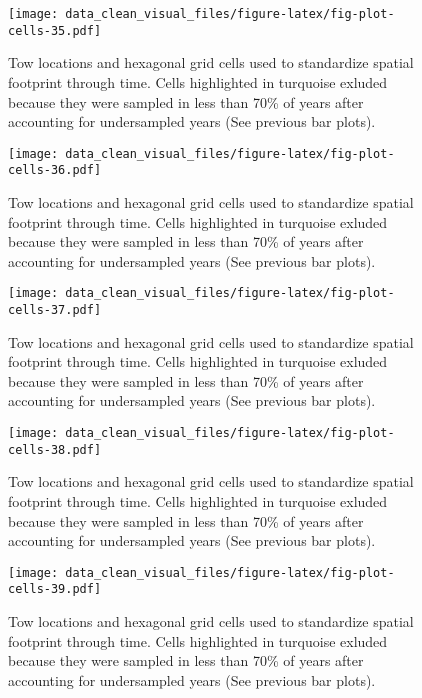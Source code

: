 \documentclass[
]{article}
\begin{document}
\begin{figure}
\centering
\texttt{[image: data\_clean\_visual\_files/figure-latex/fig-plot-cells-35.pdf]}
\caption{\label{fig:fig-plot-cells-35}Tow locations and hexagonal grid cells used to standardize spatial footprint through time. Cells highlighted in turquoise exluded because they were sampled in less than 70\% of years after accounting for undersampled years (See previous bar plots).}
\end{figure}

\begin{figure}
\centering
\texttt{[image: data\_clean\_visual\_files/figure-latex/fig-plot-cells-36.pdf]}
\caption{\label{fig:fig-plot-cells-36}Tow locations and hexagonal grid cells used to standardize spatial footprint through time. Cells highlighted in turquoise exluded because they were sampled in less than 70\% of years after accounting for undersampled years (See previous bar plots).}
\end{figure}

\begin{figure}
\centering
\texttt{[image: data\_clean\_visual\_files/figure-latex/fig-plot-cells-37.pdf]}
\caption{\label{fig:fig-plot-cells-37}Tow locations and hexagonal grid cells used to standardize spatial footprint through time. Cells highlighted in turquoise exluded because they were sampled in less than 70\% of years after accounting for undersampled years (See previous bar plots).}
\end{figure}

\begin{figure}
\centering
\texttt{[image: data\_clean\_visual\_files/figure-latex/fig-plot-cells-38.pdf]}
\caption{\label{fig:fig-plot-cells-38}Tow locations and hexagonal grid cells used to standardize spatial footprint through time. Cells highlighted in turquoise exluded because they were sampled in less than 70\% of years after accounting for undersampled years (See previous bar plots).}
\end{figure}

\begin{figure}
\centering
\texttt{[image: data\_clean\_visual\_files/figure-latex/fig-plot-cells-39.pdf]}
\caption{\label{fig:fig-plot-cells-39}Tow locations and hexagonal grid cells used to standardize spatial footprint through time. Cells highlighted in turquoise exluded because they were sampled in less than 70\% of years after accounting for undersampled years (See previous bar plots).}
\end{figure}
\end{document}
